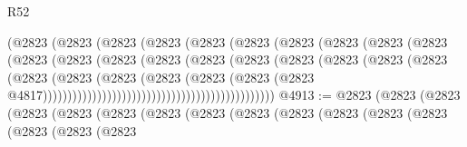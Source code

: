 \begin{lexlean}{R52}
\begin{coremodule}
{{{{{{{{{{{{{{{{{{{{{{{{{{{{{{{{{{{{{{{{{{{{{{{{{{{{{{{{{{{{{{{{{{{{{{{{{{{{{{{{{{{{{{{{{{{{{{{{{{{{{{{{{{{{{{{{{{{{{{{{{{{{{{{{{{{{{{{{{{{{{{{{{{{{{{{{{{{{{{{{{{{{{{{{{{{{{{{{{{{{{{{{{{{{{{{{{{{{{{                                            (@2823
                                              (@2823
                                                (@2823
                                                  (@2823
                                                    (@2823
                                                      (@2823
                                                        (@2823
                                                          (@2823
                                                            (@2823
                                                              (@2823
                                                                (@2823
                                                                  (@2823
                                                                    (@2823
                                                                      (@2823
                                                                        (@2823
                                                                          (@2823
                                                                            (@2823
                                                                              (@2823
                                                                                (@2823
                                                                                  (@2823
                                                                                    (@2823
                                                                                      (@2823
                                                                                        (@2823
                                                                                          (@2823
                                                                                            (@2823
                                                                                              (@2823
                                                                                                (@2823
                                                                                                  @4817)))))))))))))))))))))))))))))))))))))))))))))))
@4913 := @2823
    (@2823
      (@2823
        (@2823
          (@2823
            (@2823
              (@2823
                (@2823
                  (@2823
                    (@2823
                      (@2823
                        (@2823
                          (@2823
                            (@2823
                              (@2823
                                (@2823
}}}}}}}}}}}}}}}}}}}}}}}}}}}}}}}}}}}}}}}}}}}}}}}}}}}}}}}}}}}}}}}}}}}}}}}}}}}}}}}}}}}}}}}}}}}}}}}}}}}}}}}}}}}}}}}}}}}}}}}}}}}}}}}}}}}}}}}}}}}}}}}}}}}}}}}}}}}}}}}}}}}}}}}}}}}}}}}}}}}}}}}}}}}}}}}}}}}}}}
\end{coremodule}
\end{lexlean}
